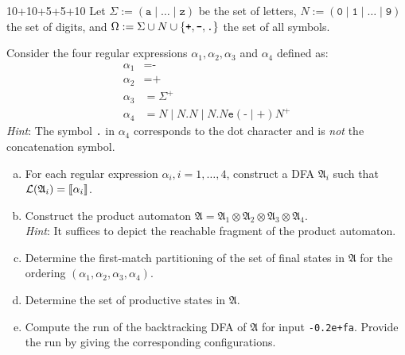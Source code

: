 \begin{exercise}{10+10+5+5+10}
  Let $\Sigma :=(\texttt{a} \mid \ldots \mid \texttt{z})$ be the set of letters, $N := (\texttt{0} \mid \texttt{1} \mid \ldots \mid \texttt{9})$ the set of digits, and $\Omega := \Sigma \cup N \cup \left\{ \texttt{+}, \texttt{-}, \texttt{.} \right\}$ the set of all symbols.

  Consider the four regular expressions $\alpha_1, \alpha_2, \alpha_3$ and $\alpha_4$ defined as:
    \begin{align*}
        \alpha_1 &= \texttt{-} \\
        \alpha_2 &= \texttt{+} \\
        \alpha_3 &= \Sigma^+ \\
        \alpha_4 &= N \mid N\texttt{.}N \mid N\texttt{.}N \texttt{e} (\texttt{-} \mid \texttt{+}) N^+
    \end{align*}
    \emph{Hint}: The symbol \texttt{.} in $\alpha_4$ corresponds to the dot character and is \emph{not} the concatenation symbol.
  \begin{enumerate}[(a)]
    \item For each regular expression $\alpha_i, i=1, \dots, 4$, construct a DFA $\mathfrak{A}_i$ such that $\mathcal{L}(\mathfrak{A}_i) = \llbracket\alpha_i\rrbracket$.
    \item Construct the product automaton $\mathfrak{A} = \mathfrak{A}_1 \otimes \mathfrak{A}_2 \otimes \mathfrak{A}_3 \otimes \mathfrak{A}_4$.\\
        \emph{Hint}: It suffices to depict the reachable fragment of the product automaton.
    \item Determine the first-match partitioning of the set of final states in $\mathfrak{A}$ for the ordering $(\alpha_1, \alpha_2, \alpha_3, \alpha_4)$.
    \item Determine the set of productive states in $\mathfrak{A}$.
    \item Compute the run of the backtracking DFA of $\mathfrak{A}$ for input \texttt{-0.2e+fa}. Provide the run by giving the corresponding configurations.
  \end{enumerate}
\end{exercise}

